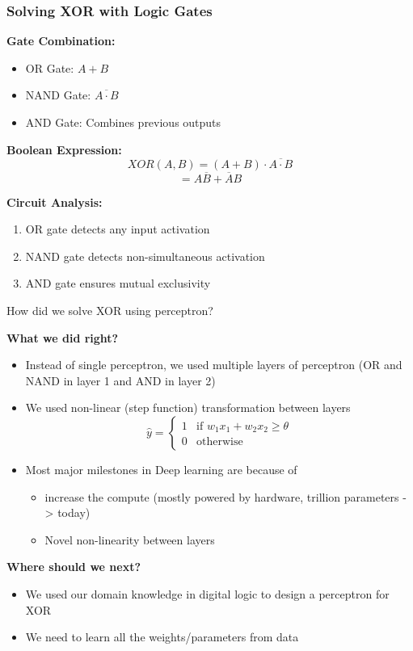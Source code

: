 \documentclass[5pt,aspectratio=169]{beamer}
\begin{document}
\begin{frame}
\frametitle{Solving XOR with Logic Gates}

\textbf{Gate Combination:}
\begin{itemize}
\item OR Gate: $A + B$
\item NAND Gate: $\overline{A \cdot B}$ 
\item AND Gate: Combines previous outputs
\end{itemize}

\textbf{Boolean Expression:}
\[
XOR(A,B) = (A + B) \cdot \overline{A \cdot B}
\]
\[
= A\overline{B} + \overline{A}B
\]

\textbf{Circuit Analysis:}
\begin{enumerate}
\item OR gate detects any input activation
\item NAND gate detects non-simultaneous activation
\item AND gate ensures mutual exclusivity
\end{enumerate}

\end{frame}

\begin{frame}{How did we solve XOR using perceptron?}


\textbf{What we did right?}
\begin{itemize}
    \item<1-> Instead of single perceptron, we used multiple layers of perceptron (OR and NAND in layer 1 and AND in layer 2)
    \item<2-> We used non-linear (step function) transformation between layers
    \[
    \hat{y} = \begin{cases} 
    1 & \text{if } w_1x_1 + w_2x_2 \geq \theta \\
    0 & \text{otherwise}
    \end{cases}
    \]
    \item<3-> Most major milestones in Deep learning are because of
        \begin{itemize}
            \item increase the compute (mostly powered by hardware, trillion parameters -> today)
            \item Novel non-linearity between layers    
        \end{itemize}

\end{itemize}

\textbf{Where should we next?}
\begin{itemize}
    \item<3-> We used our domain knowledge in digital logic to design a perceptron for XOR
    \item<4-> We need to learn all the weights/parameters from data
\end{itemize}
    
\end{frame}
\end{document}
